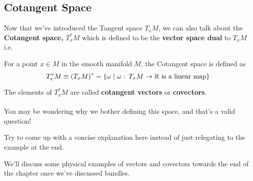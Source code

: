 \documentclass[11pt]{article}
\begin{document}
\subsection{Cotangent Space}
Now that we've introduced the Tangent space $T_{x} M$, we can also talk about the \textbf{Cotangent space, $T_x^{*}M$} which is defined to be the \textbf{vector space dual} to $T_{x} M$ i.e.
\begin{redbox}
  For a point $x \in M$ in the smooth manifold $M$, the Cotangent space is defined as 
  \[ T_{x}^{*}M \equiv \left(T_x M\right)^{*} = \left\{ \omega \;\vert\; \omega \text{ : } T_{x} M \rightarrow \mathbb{R} \text{ is a linear map} \right\} \]
\end{redbox}
The elements of $T_x^*M$ are called \textbf{cotangent vectors} or \textbf{covectors}.
\\
\\
You may be wondering why we bother defining this space, and that's a valid question! \begin{note}
  {Try to come up with a concise explanation here instead of just relegating to the example at the end.}
\end{note} We'll discuss some physical examples of vectors and covectors towards the end of the chapter once we've discussed bundles.
\\
\end{document}
